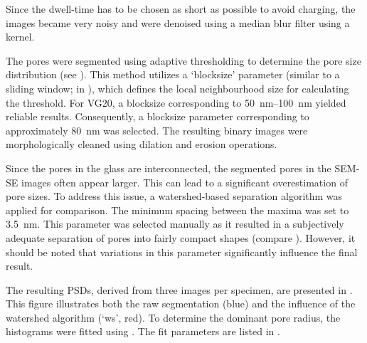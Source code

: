 Since the dwell-time has to be chosen as short as possible to avoid charging, the images became very noisy and were denoised using a median blur filter using a  kernel.

The pores were segmented using adaptive thresholding to determine the pore size distribution (see ).
This method utilizes a `blocksize' parameter (similar to a sliding window; in \unit{\px}), which defines the local neighbourhood size for calculating the threshold.
For \acs{VG20}, a blocksize corresponding to \qtyrange{50}{100}{\nano\meter} yielded reliable results.
Consequently, a blocksize parameter corresponding to approximately \qty{80}{\nano\meter} was selected.
The resulting binary images were morphologically cleaned using dilation and erosion operations.

Since the pores in the glass are interconnected, the segmented pores in the \ac{SEM}-\ac{SE} images often appear larger.
This can lead to a significant overestimation of pore sizes.
To address this issue, a watershed-based separation algorithm was applied for comparison.
The minimum spacing between the maxima was set to \qty{3.5}{\nano\meter}.
This parameter was selected manually as it resulted in a subjectively adequate separation of pores into fairly compact shapes (compare ).
However, it should be noted that variations in this parameter significantly influence the final result.

The resulting \ac{PSD}s, derived from three images per specimen, are presented in .
This figure illustrates both the raw segmentation (blue) and the influence of the watershed algorithm (`ws', red).
To determine the dominant pore radius, the histograms were fitted using .
The fit parameters are listed in .


